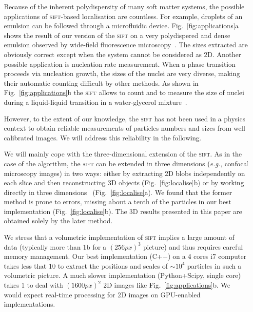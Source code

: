 \documentclass[8.5pt,twoside,twocolumn]{article}
\begin{document}
Because of the inherent polydispersity of many soft matter systems, the possible applications of \textsc{sift}-based localisation are countless. For example, droplets of an emulsion can be followed through a microfluidic device. Fig.~\ref{fig:applications}a shows the result of our version of the \textsc{sift} on a very polydispered and dense emulsion observed by wide-field fluorescence microscopy~\cite{Montagne2011}. The sizes extracted are obviously correct except when the system cannot be considered as 2D. Another possible application is nucleation rate measurement. When a phase transition proceeds via nucleation growth, the sizes of the nuclei are very diverse, making their automatic counting difficult by other methods. As shown in Fig.~\ref{fig:applications}b the \textsc{sift} allows to count and to measure the size of nuclei during a liquid-liquid transition in a water-glycerol mixture~\cite{Murata2012}.

However, to the extent of our knowledge, the \textsc{sift} has not been used in a physics context to obtain reliable measurements of particles numbers and sizes from well calibrated images. We will address this reliability in the following.

We will mainly cope with the three-dimensional extension of the \textsc{sift}. As in the case of the \citet{Crocker1996} algorithm, the \textsc{sift} can be extended in three dimensions (\emph{e.g.}, confocal microscopy images) in two ways: either by extracting 2D blobs independently on each slice and then reconstructing 3D objects (Fig.~\ref{fig:localise}b) or by working directly in three dimensions~\cite{Urschler2006, Cheung2009} (Fig.~\ref{fig:localise}a). We found that the former method is prone to errors, missing about a tenth of the particles in our best implementation (Fig.~\ref{fig:localise}b). The 3D results presented in this paper are obtained solely by the later method.

We stress that a volumetric implementation of \textsc{sift} implies a large amount of data (typically more than \unit{1}{\giga b} for a $(\unit{256}{px})^3$ picture) and thus requires careful memory management. Our best implementation (C++) on a 4 cores i7 computer takes less that \unit{10}{\second} to extract the positions and scales of $\sim 10^4$ particles in such a volumetric picture. A much slower implementation (Python+Scipy, single core) takes \unit{1}{\second} to deal with $(\unit{1600}{px})^2$ 2D images like Fig.~\ref{fig:applications}b. We would expect real-time processing for 2D images on GPU-enabled implementations.
\end{document}
